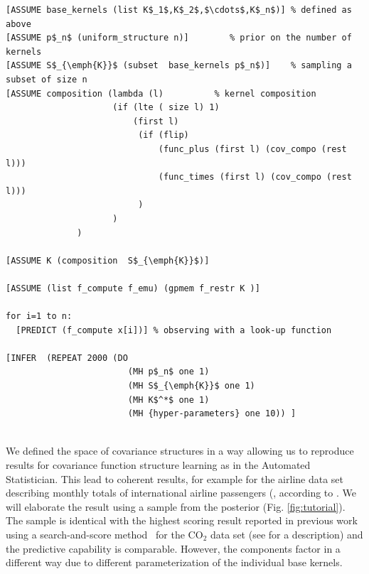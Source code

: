 \documentclass{article} %
\begin{document}
\begin{minipage}{\linewidth}
\small
\begin{lstlisting}[frame=single,label=alg:structureVent,caption=Venture Code for Bayesian GP Structure Learning,mathescape]
[ASSUME base_kernels (list K$_1$,K$_2$,$\cdots$,K$_n$)] % defined as above
[ASSUME p$_n$ (uniform_structure n)]        % prior on the number of kernels
[ASSUME S$_{\emph{K}}$ (subset  base_kernels p$_n$)]    % sampling a subset of size n
[ASSUME composition (lambda (l)          % kernel composition
                     (if (lte ( size l) 1)
                         (first l)
                          (if (flip)
                              (func_plus (first l) (cov_compo (rest l)))
                              (func_times (first l) (cov_compo (rest l)))
                          )
                     )
              )

[ASSUME K (composition  S$_{\emph{K}}$)]

[ASSUME (list f_compute f_emu) (gpmem f_restr K )]

for i=1 to n:
  [PREDICT (f_compute x[i])] % observing with a look-up function

[INFER  (REPEAT 2000 (DO 
                        (MH p$_n$ one 1) 
                        (MH S$_{\emph{K}}$ one 1) 
                        (MH K$^*$ one 1) 
                        (MH {hyper-parameters} one 10)) ]


\end{lstlisting}

\end{minipage}

We defined the space of covariance structures in a way allowing us to reproduce results for covariance function structure learning as in the Automated Statistician. This lead to coherent results, for example for the airline data set describing monthly totals of international airline passengers (\citealp{box2011time}, according to \citealp{duvenaud2013structure}. We will elaborate the result using a sample from the posterior (Fig. \ref{fig:tutorial}). The sample is identical with the highest scoring result reported in previous work using a search-and-score method~\citep{duvenaud2013structure} for the CO$_2$ data set (see \citealp{rasmussen2006gaussian} for a description) and the predictive capability is comparable. However, the components factor in a different way due to different parameterization of the individual base kernels.
\end{document}
